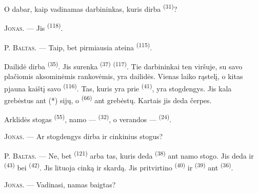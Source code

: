 O dabar, kaip vadinamas darbininkas, kuris dirba 
\textsuperscript{(31)}?

\textsc{Jonas}. --- Jis  \textsuperscript{(118)}.

\VUsaut{3.0mm}
\VUsaut{3.0mm}

P. \textsc{Baltas}. --- Taip, bet pirmiausia ateina 
\textsuperscript{(115)}.

Dailidė dirba  \textsuperscript{(35)}. Jis surenka
 \textsuperscript{(37)}  \textsuperscript{(117)}. Tie
darbininkai ten viršuje, su savo plačiomis aksominėmis rankovėmis, yra dailidės.
Vienas laiko rąstelį, o kitas pjauna kaištį savo 
\textsuperscript{(116)}. Tas, kuris yra prie  \textsuperscript{(41)},
yra stogdengys. Jis kala grebėstus ant (*) sijų, o 
\textsuperscript{(66)} ant grebėstų. Kartais jis deda čerpes.


Arklidės stogas  \textsuperscript{(55)}, namo ---
 \textsuperscript{(32)}, o verandos --- 
\textsuperscript{(24)}.

\textsc{Jonas}. --- Ar stogdengys dirba ir cinkinius stogus?

P. \textsc{Baltas}. --- Ne, bet  \textsuperscript{(121)} arba
 tas, kuris deda  \textsuperscript{(38)} ant
namo stogo. Jis deda ir  \textsuperscript{(43)} bei
 \textsuperscript{(42)}. Jis lituoja cinką ir skardą. Jis pritvirtino
 \textsuperscript{(40)} ir  \textsuperscript{(39)}
ant  \textsuperscript{(36)}.

\textsc{Jonas}. --- Vadinasi, namas baigtas?

\VUsaut{3.0mm}
\VUsaut{3.0mm}


